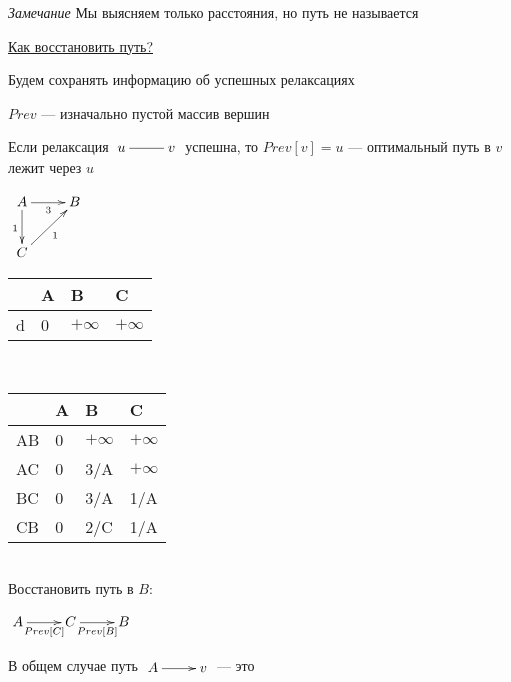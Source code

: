 \documentclass[a4paper, 12pt] {article}
\begin{document}
\textit{Замечание} Мы выясняем только расстояния, но путь не называется

\underline{Как восстановить путь?}

Будем сохранять информацию об успешных  релаксациях

$ Prev $ --- изначально пустой массив вершин

Если релаксация $\begin{matrix}
	\xymatrix{
		u \ar@{-}[r] & v  \\
	}
\end{matrix}$ успешна, то $ Prev[v] = u $ --- оптимальный путь в $ v $ лежит через $ u $

$\begin{matrix}
	\xymatrix{
		A \ar@{->}[r]_3 \ar@{->}[d]_1 & B  \\
		C \ar@{->}[ru]_1 \\
	}
\end{matrix}$

\begin{tabular}{ | l | l | l |  l | }
	\hline
	& A & B & C   \\ \hline
	d & 0 & $ + \infty $ & $ + \infty $  \\ \hline
	
\end{tabular}\\

\begin{tabular}{ | l | l | l |  l  | }
	\hline
	& A & B & C   \\ \hline
	AB & 0 & $ + \infty $ & $ + \infty $   \\ \hline
	AC & 0 & 3/A & $ + \infty $  \\ \hline
	BC & 0 & 3/A & 1/A  \\ \hline
	CB & 0 & 2/C & 1/A  \\
	\hline
\end{tabular}\\

Восстановить путь в $ B$:

$\begin{matrix}
	\xymatrix{
		A \ar@{->}[r]_{Prev[C]} & C \ar@{->}[r]_{Prev[B]} & B  \\
	}
\end{matrix}$

В общем случае путь $\begin{matrix}
	\xymatrix{
		A \ar@{->}[r] & v  \\
	}
\end{matrix}$ --- это
\end{document}
